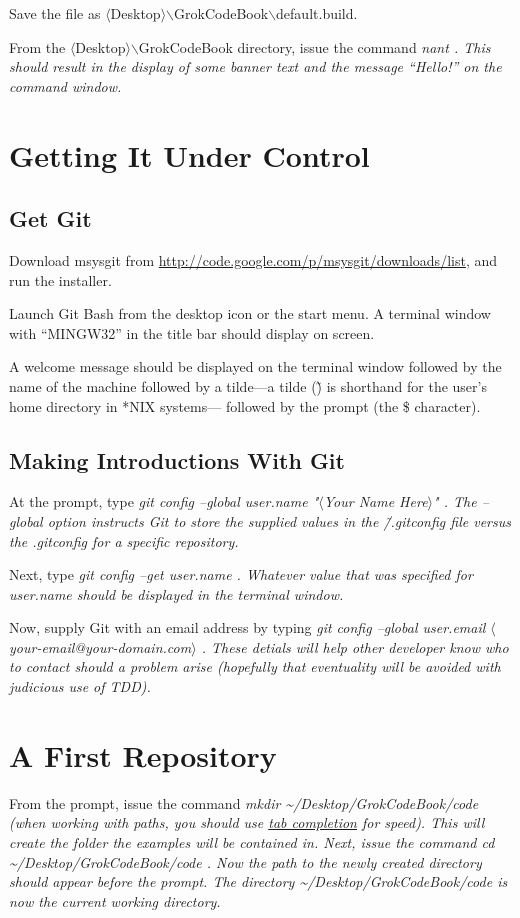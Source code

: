 Save the file as $\langle$Desktop$\rangle$$\backslash$GrokCodeBook$\backslash$default.build.

From the $\langle$Desktop$\rangle$$\backslash$GrokCodeBook directory, issue the command \em nant \em. This should result in the display of some banner text and the message ``Hello!'' on the command window.

\section{Getting It Under Control}
\subsection{Get Git}
Download msysgit from \url{http://code.google.com/p/msysgit/downloads/list}, and run the installer.

Launch Git Bash from the desktop icon or the start menu. A terminal window with ``MINGW32'' in the title bar should display on screen.

A welcome message should be displayed on the terminal window followed by the name of the machine followed by a tilde---a tilde (\~) is shorthand for the user's home directory in *NIX systems--- followed by the prompt (the \$ character).

\subsection{Making Introductions With Git}
At the prompt, type \em git config --global user.name "$\langle$Your Name Here$\rangle$" \em. The \em --global \em option instructs Git to store the supplied values in the \em \~/.gitconfig \em file versus the \em .gitconfig \em for a specific repository.

Next, type \em git config --get user.name \em. Whatever value that was specified for \em user.name \em should be displayed in the terminal window.

Now, supply Git with an email address by typing \em git config --global user.email $\langle$your-email@your-domain.com$\rangle$ \em. These detials will help other developer know who to contact should a problem arise (hopefully that eventuality will be avoided with judicious use of \gls{TDD}).

\section{A First Repository}
From the prompt, issue the command \em mkdir \textasciitilde/Desktop/GrokCodeBook/code \em (when working with paths, you should use \hyperref[tab-completion]{tab completion} for speed). This will create the folder the examples will be contained in. Next, issue the command \em cd \textasciitilde/Desktop/GrokCodeBook/code \em. Now the path to the newly created directory should appear before the prompt. The directory \em \textasciitilde/Desktop/GrokCodeBook/code \em is now the current working directory.

